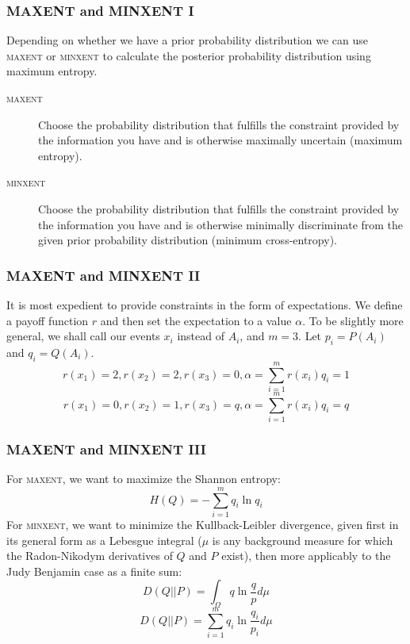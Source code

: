 \documentclass[xcolor=dvipsnames]{beamer}
\begin{document}
\begin{frame}
  \frametitle{MAXENT and MINXENT I}
Depending on whether we have a prior probability distribution we can
use \textsc{maxent} or \textsc{minxent} to calculate the posterior
probability distribution using maximum entropy.
\begin{description}
\item[\textsc{maxent}] Choose the probability distribution that
  fulfills the constraint provided by the information you have and is
  otherwise maximally uncertain (maximum entropy).
\item[\textsc{minxent}] Choose the probability distribution that
  fulfills the constraint provided by the information you have and is
  otherwise minimally discriminate from the given prior probability
  distribution (minimum cross-entropy).
\end{description}
\end{frame}

\begin{frame}
  \frametitle{MAXENT and MINXENT II}
  It is most expedient to provide constraints in the form of
  expectations. We define a payoff function $r$ and then set the
  expectation to a value $\alpha$. To be slightly more general, we
  shall call our events $x_{i}$ instead of $A_{i}$, and $m=3$. Let
  $p_{i}=P(A_{i})$ and $q_{i}=Q(A_{i})$.
  \begin{equation}
    \label{eq:map1}
    r(x_{1})=2,r(x_{2})=2,r(x_{3})=0,\alpha=\sum_{i=1}^{m}r(x_{i})q_{i}=1\tag{MAP}
  \end{equation}
  \begin{equation}
    \label{eq:hdq1}
    r(x_{1})=0,r(x_{2})=1,r(x_{3})=q,\alpha=\sum_{i=1}^{m}r(x_{i})q_{i}=q\tag{HDQ}
  \end{equation}
\end{frame}

\begin{frame}
  \frametitle{MAXENT and MINXENT III}
  For \textsc{maxent}, we want to maximize the Shannon entropy:
  \begin{equation}
    \label{eq:maxentfin}
    H(Q)=-\sum_{i=1}^{m}q_{i}\ln{}q_{i}
  \end{equation}
  For \textsc{minxent}, we want to minimize the Kullback-Leibler
  divergence, given first in its general form as a Lebesgue integral
  ($\mu$ is any background measure for which the Radon-Nikodym
  derivatives of $Q$ and $P$ exist), then more applicably to the Judy
  Benjamin case as a finite sum:
  \begin{equation*}
    \label{eq:minxentleb}
    D(Q||P)=\int_{\Omega}q\ln\frac{q}{p}d\mu
  \end{equation*}
  \begin{equation}
    \label{eq:minxentfin}
    D(Q||P)=\sum_{i=1}^{m}q_{i}\ln\frac{q_{i}}{p_{i}}d\mu
  \end{equation}
\end{frame}
\end{document}
